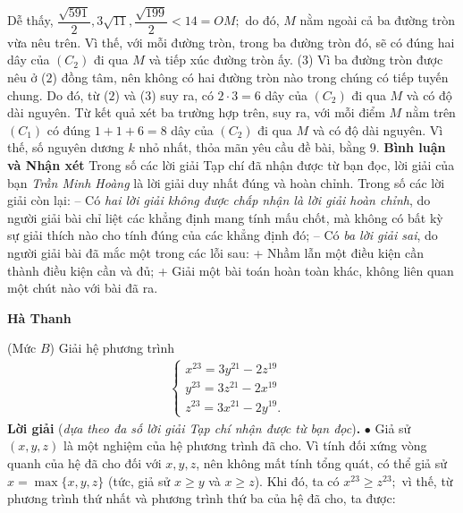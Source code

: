 \begin{multicols}{2}
	\vskip 0.05cm
	Dễ thấy, $\dfrac{{\sqrt {591} }}{2},3\sqrt {11} ,\dfrac{{\sqrt {199} }}{2} < 14 = OM;$  do đó, $M$ nằm ngoài cả ba đường tròn vừa nêu trên. Vì thế, với mỗi đường tròn, trong ba đường tròn đó, sẽ có đúng hai dây của  $(C_2)$ đi qua $M$ và tiếp xúc đường tròn ấy.                  \hfill ($3$)
	\vskip 0.05cm
	Vì ba đường tròn được nêu ở ($2$) đồng tâm, nên không có hai đường tròn nào trong chúng có tiếp tuyến chung. Do đó, từ ($2$) và ($3$) suy ra, có $2 \cdot 3 = 6$  dây của  $(C_2)$ đi qua $M$ và có độ dài nguyên.
	\vskip 0.05cm
	Từ kết quả xét ba trường hợp trên, suy ra, với mỗi điểm $M$ nằm trên $(C_1)$  có đúng $1 + 1 + 6 = 8$ dây của $(C_2)$  đi qua $M$ và có độ dài nguyên. Vì thế, số nguyên dương $k$ nhỏ nhất, thỏa mãn yêu cầu đề bài, bằng $9$.
	\vskip 0.05cm
	\textbf{\color{thachthuctoanhoc}Bình luận và Nhận xét}
	\vskip 0.05cm
	Trong số các lời giải Tạp chí đã nhận được từ bạn đọc, lời giải của bạn \textit{Trần Minh Hoàng} là lời giải duy nhất đúng và hoàn chỉnh. Trong số các lời giải còn lại:
	\vskip 0.05cm
	-- Có \textit{hai lời giải không được chấp nhận là lời giải hoàn chỉnh}, do người giải bài chỉ liệt các khẳng định mang tính mấu chốt, mà không có bất kỳ sự giải thích nào cho tính đúng của các khẳng định đó;
	\vskip 0.05cm
	-- Có \textit{ba lời giải sai}, do người giải bài đã mắc một trong các lỗi sau:
	\vskip 0.05cm
	+ Nhầm lẫn một điều kiện cần thành điều kiện cần và đủ;
	\vskip 0.05cm
	+ Giải một bài toán hoàn toàn khác, không liên quan một chút nào với bài đã ra.
	\begin{flushright}
		\textbf{\color{thachthuctoanhoc}Hà Thanh}
	\end{flushright}
	{}
	(Mức $B$) Giải hệ phương trình
	\begin{align*}
		\begin{cases}
			x^{23}=3y^{21}-2z^{19}&\\[-0.5ex]
			y^{23}=3z^{21}-2x^{19}&\\[-0.5ex]
			z^{23}=3x^{21}-2y^{19}.
		\end{cases}
	\end{align*}
	\textbf{\color{thachthuctoanhoc}Lời giải} (\textit{dựa theo đa số lời giải Tạp chí nhận được từ bạn đọc})\textbf{\color{thachthuctoanhoc}.}
	\vskip 0.05cm
	$\bullet$ Giả sử $(x, y, z)$ là một nghiệm của hệ phương trình đã cho.
	\vskip 0.05cm
	Vì tính đối xứng vòng quanh của hệ đã cho đối với $x, y, z$, nên không mất tính tổng quát, có thể giả sử $x = \max\{x, y, z\}$ (tức, giả sử $x \ge y$ và $x \ge z$).
	\vskip 0.05cm
	Khi đó, ta có ${x^{23}} \ge {z^{23}};$ vì thế, từ phương trình thứ nhất và phương trình thứ ba của hệ đã cho, ta được:

\end{multicols}
